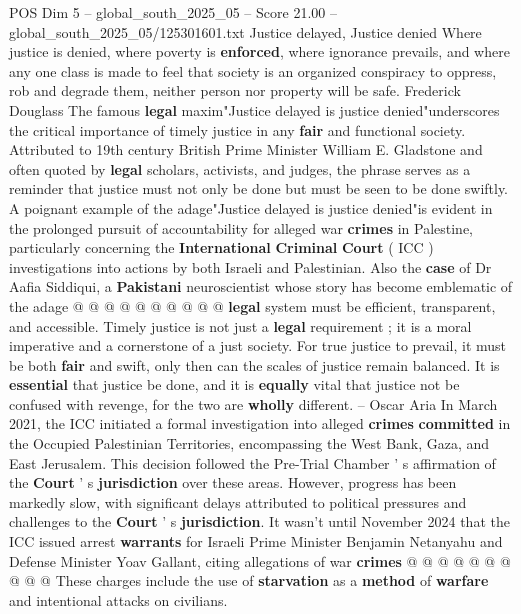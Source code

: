 \begin{textsample}{POS Dim 5 – global\_south\_2025\_05 – Score 21.00 – global\_south\_2025\_05/125301601.txt}  \label{ex:f5_pos_112}
Justice delayed, Justice denied Where justice is denied, where poverty is \textbf{enforced}, where ignorance prevails, and where any one class is made to feel that society is an organized conspiracy to oppress, rob and degrade them, neither person nor property will be safe.
Frederick Douglass The famous \textbf{legal} maxim"Justice delayed is justice denied"underscores the critical importance of timely justice in any \textbf{fair} and functional society.
Attributed to 19th century British Prime Minister William E.
Gladstone and often quoted by \textbf{legal} scholars, activists, and judges, the phrase serves as a reminder that justice must not only be done but must be seen to be done swiftly.
A poignant example of the adage"Justice delayed is justice denied"is evident in the prolonged pursuit of accountability for alleged war \textbf{crimes} in Palestine, particularly concerning the \textbf{International} \textbf{Criminal} \textbf{Court} ( ICC ) investigations into actions by both Israeli and Palestinian.
Also the \textbf{case} of Dr Aafia Siddiqui, a \textbf{Pakistani} neuroscientist whose story has become emblematic of the adage @ @ @ @ @ @ @ @ @ @ \textbf{legal} system must be efficient, transparent, and accessible.
Timely justice is not just a \textbf{legal} requirement ; it is a moral imperative and a cornerstone of a just society.
For true justice to prevail, it must be both \textbf{fair} and swift, only then can the scales of justice remain balanced.
It is \textbf{essential} that justice be done, and it is \textbf{equally} vital that justice not be confused with revenge, for the two are \textbf{wholly} different. -- Oscar Aria In March 2021, the ICC initiated a formal investigation into alleged \textbf{crimes} \textbf{committed} in the Occupied Palestinian Territories, encompassing the West Bank, Gaza, and East Jerusalem.
This decision followed the Pre-Trial Chamber ' s affirmation of the \textbf{Court} ' s \textbf{jurisdiction} over these areas.
However, progress has been markedly slow, with significant delays attributed to political pressures and challenges to the \textbf{Court} ' s \textbf{jurisdiction}.
It wasn't until November 2024 that the ICC issued arrest \textbf{warrants} for Israeli Prime Minister Benjamin Netanyahu and Defense Minister Yoav Gallant, citing allegations of war \textbf{crimes} @ @ @ @ @ @ @ @ @ @ These charges include the use of \textbf{starvation} as a \textbf{method} of \textbf{warfare} and intentional attacks on civilians.

\end{textsample}
